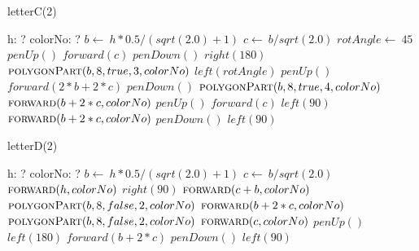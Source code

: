 \documentclass[a4paper,10pt]{article}
\begin{document}
\begin{algorithm}
\caption{letterC(2)}
\begin{algorithmic}[5]
\State {}
\State {}
    \State h: ?
    \State colorNo: ?
  \EndDecl
  \State \(b\gets\ h*0.5/(sqrt(2.0)+1)\)
  \State \(c\gets\ b/sqrt(2.0)\)
  \State \(rotAngle\gets\ 45\)
  \State \(penUp()\)
  \State \(forward(c)\)
  \State \(penDown()\)
  \State \(right(180)\)
  \State {}
  \State {}
  \State \(\Call{polygonPart}{b,8,true,3,colorNo}\)
  \State \(left(rotAngle)\)
  \State \(penUp()\)
  \State \(forward(2*b+2*c)\)
  \State \(penDown()\)
  \State {}
  \State {}
  \State \(\Call{polygonPart}{b,8,true,4,colorNo}\)
  \State \(\Call{forward}{b+2*c,colorNo}\)
  \State \(penUp()\)
  \State \(forward(c)\)
  \State \(left(90)\)
  \State \(\Call{forward}{b+2*c,colorNo}\)
  \State \(penDown()\)
  \State \(left(90)\)
\EndProcedure
\end{algorithmic}
\end{algorithm}


\begin{algorithm}
\caption{letterD(2)}
\begin{algorithmic}[5]
\State {}
\State {}
    \State h: ?
    \State colorNo: ?
  \EndDecl
  \State \(b\gets\ h*0.5/(sqrt(2.0)+1)\)
  \State \(c\gets\ b/sqrt(2.0)\)
  \State \(\Call{forward}{h,colorNo}\)
  \State \(right(90)\)
  \State \(\Call{forward}{c+b,colorNo}\)
  \State {}
  \State {}
  \State \(\Call{polygonPart}{b,8,false,2,colorNo}\)
  \State \(\Call{forward}{b+2*c,colorNo}\)
  \State {}
  \State {}
  \State \(\Call{polygonPart}{b,8,false,2,colorNo}\)
  \State \(\Call{forward}{c,colorNo}\)
  \State \(penUp()\)
  \State \(left(180)\)
  \State \(forward(b+2*c)\)
  \State \(penDown()\)
  \State \(left(90)\)
\EndProcedure
\end{algorithmic}
\end{algorithm}
\end{document}
